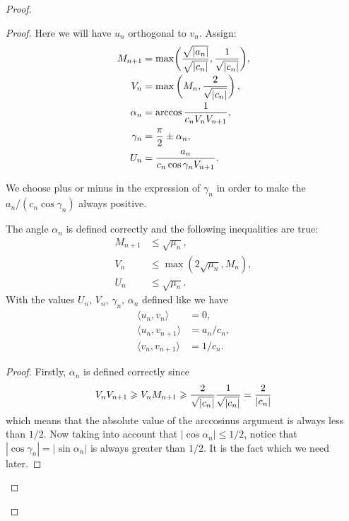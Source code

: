 \documentclass[12pt]{amsart}
\theoremstyle{case}
\begin{document}
\begin{proof}
\begin{proof}
          Here we will have $u_n$ orthogonal to $v_n$.
          Assign:
          \begin{align*}
            M_{n+1} &= \max\biggl(\smash[b]{\frac{\sqrt{|a_n|}}{\sqrt{|c_n|}}}, \frac{1}{\sqrt{\smash[b]{|c_n|}}}\biggr),\\
            V_n &= \max\left(M_n, \frac{2}{\sqrt{\smash[b]{|c_n|}}}\right),\\
            \alpha_n &= \arccos{\frac{1}{c_n V_n V_{n+1}}},\\
            \gamma_n &= \frac{\pi}{2} \pm \alpha_n,\\
            U_n &= \frac{a_n}{c_n \cos{\gamma_n} V_{n+1}}.
          \end{align*}
          \begin{remark*}
            We choose plus or minus in the expression of $\gamma_n$ in order to make the $a_n/(c_n \cos{\gamma_n})$ always positive.
          \end{remark*}
          \begin{prop}
            The angle $\alpha_n$ is defined correctly and the following inequalities are true:
            \begin{align*}
                M_{n+1} &\leq \sqrt{\mu_n},\\
                V_n &\leq \max(2\sqrt{\mu_n}, M_n),\\
                U_n &\leq \sqrt{\mu_n}.
            \end{align*}
            With the values $U_n$, $V_n$, $\gamma_n$, $\alpha_n$ defined like we have
            \begin{align*}
              \langle u_n, v_n \rangle &= 0,\\
              \langle u_n, v_{n+1} \rangle &= a_n/c_n,\\
              \langle v_n, v_{n+1} \rangle &= 1/c_n.
            \end{align*}
          \end{prop}
          \begin{proof}
            Firstly, $\alpha_n$ is defined correctly since
            \[
              V_n V_{n+1} \geq V_n M_{n+1} \geq \frac{2}{\sqrt{\smash[b]{|c_n|}}} \frac{1}{\sqrt{\smash[b]{|c_n|}}} = \frac{2}{|c_n|}
            \]
            which means that the absolute value of the arccosinus argument is always less than $1/2$.
            Now taking into account that $|\cos{\alpha_n}| \leq 1/2$, notice that $|\cos{\gamma_n}| = |\sin{\alpha_n}|$ is always greater than $1/2$.
            It is the fact which we need later.
            

\end{proof}
\end{proof}
\end{proof}
\end{document}
